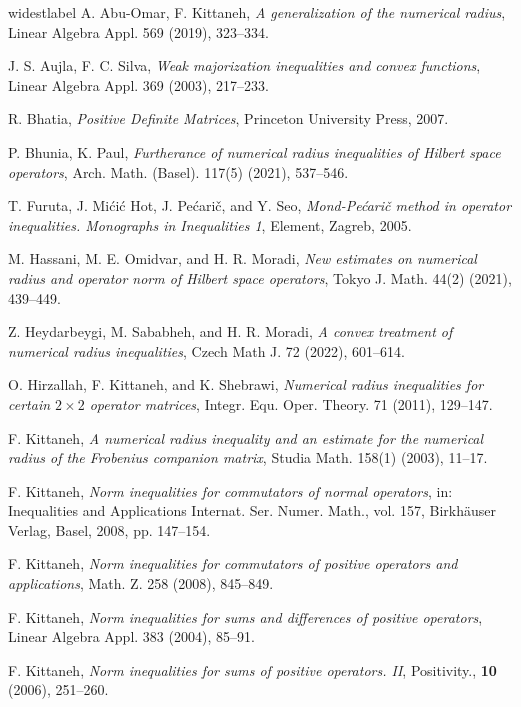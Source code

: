 \documentclass[12pt,twoside,reqno]{amsart}
\numberwithin{equation}{section}
\begin{document}
\begin{thebibliography}{widestlabel}
A. Abu-Omar, F. Kittaneh, {\it A generalization of the numerical radius},  Linear Algebra Appl. 569 (2019), 323--334.

J. S. Aujla, F. C. Silva, {\it Weak majorization inequalities and convex functions}, Linear Algebra Appl. 369 (2003), 217--233.

R. Bhatia, {\it Positive Definite Matrices}, Princeton University Press, 2007.

P. Bhunia, K. Paul, {\it Furtherance of numerical radius inequalities of Hilbert space operators}, Arch. Math. (Basel). 117(5) (2021), 537--546.


T. Furuta, J. Mi\'ci\'c Hot, J. Pe\'cari\v c, and Y. Seo, {\it Mond-Pe\'cari\v c method in operator inequalities.
Monographs in Inequalities 1}, Element, Zagreb, 2005.

M. Hassani, M. E. Omidvar, and H. R. Moradi, {\it New estimates on numerical radius and operator norm of Hilbert space operators}, Tokyo J. Math. 44(2) (2021), 439--449.


Z. Heydarbeygi, M. Sababheh, and H. R. Moradi, {\it A convex treatment of numerical radius inequalities}, Czech Math J. 72 (2022), 601--614.

O. Hirzallah, F. Kittaneh, and K. Shebrawi, {\it Numerical radius inequalities for certain $2\times 2$ operator matrices}, Integr. Equ. Oper. Theory. 71 (2011), 129--147.

F. Kittaneh, {\it A numerical radius inequality and an estimate for the numerical radius of the Frobenius companion matrix}, Studia Math. 158(1) (2003), 11--17.


 F. Kittaneh, {\it Norm inequalities for commutators of normal operators}, in: Inequalities and Applications Internat. Ser. Numer. Math., vol. 157, Birkh\"auser Verlag, Basel, 2008, pp. 147--154.

F. Kittaneh, {\it Norm inequalities for commutators of positive operators and applications}, Math. Z. 258 (2008), 845--849.

F. Kittaneh, {\it Norm inequalities for sums and differences of positive operators}, Linear Algebra Appl. 383 (2004), 85--91.

F. Kittaneh, {\it Norm inequalities for sums of positive operators. II}, Positivity., {\bf 10} (2006), 251--260.


\end{thebibliography}
\end{document}
